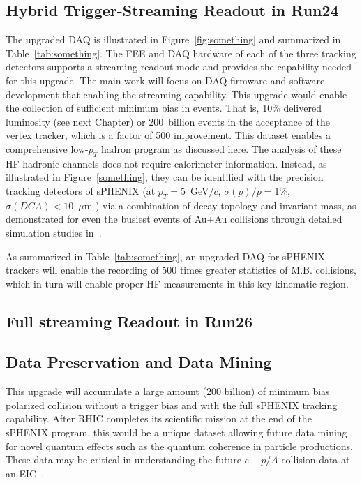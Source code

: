 \subsection{Hybrid Trigger-Streaming Readout in Run24}
 
The upgraded DAQ is illustrated in Figure~\ref{fig:something} and
summarized in Table~\ref{tab:something}.  The FEE and DAQ hardware of
each of the three tracking detectors supports a streaming readout mode
and provides the capability needed for this upgrade. The main work
will focus on DAQ firmware and software development that enabling the
streaming capability.  This upgrade would enable the collection of
sufficient minimum bias in \pp events.  That is, 10\% delivered
luminosity (see next Chapter) or 200~billion events in the acceptance
of the vertex tracker, which is a factor of 500 improvement. This
dataset enables a comprehensive low-$p_T$ hadron program as discussed
here.  The analysis of these HF hadronic channels does not require
calorimeter information. Instead, as illustrated in
Figure~\ref{something}, they can be identified with the precision
tracking detectors of sPHENIX (at $p_T=5$~GeV$/c$, $\sigma(p)/p=1\%$,
$\sigma(DCA)<10$~$\mu$m ) via a combination of decay topology and
invariant mass, as demonstrated for even the busiest events of Au+Au
collisions through detailed simulation studies in~\cite{something}.

As summarized in Table~\ref{tab:something}, an upgraded DAQ for
sPHENIX trackers will enable the recording of 500 times greater
statistics of M.B. \pp collisions, which in turn will enable proper HF
measurements in this key kinematic region.

\subsection{Full streaming Readout in Run26}
 

\subsection{Data Preservation and Data Mining}

This upgrade will accumulate a large amount (200 billion) of minimum
bias polarized \pp collision without a trigger bias and with the full
sPHENIX tracking capability. After RHIC completes its scientific
mission at the end of the sPHENIX program, this would be a unique
dataset allowing future data mining for novel quantum effects such as
the quantum coherence in particle productions. These \pp data may be
critical in understanding the future $e+p/A$ collision data at an
EIC~\cite{something}.
